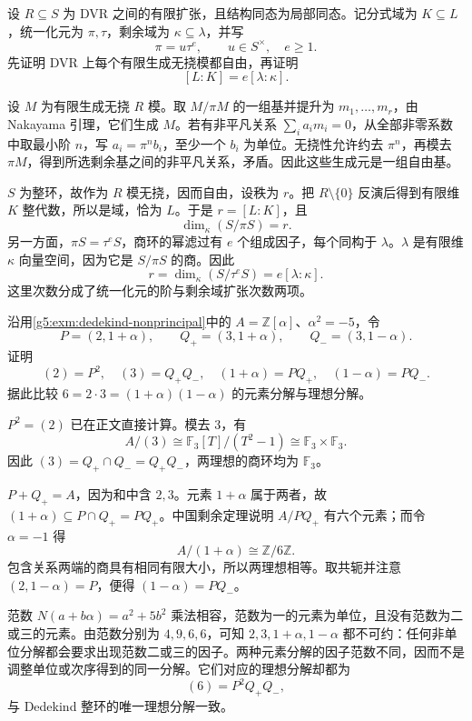 \begin{exercise}\label{g5:ex:finite-dvr-degree}
	设 \(R\subseteq S\) 为 DVR 之间的有限扩张，且结构同态为局部同态。记分式域为 \(K\subseteq L\)，统一化元为 \(\pi,\tau\)，剩余域为 \(\kappa\subseteq\lambda\)，并写
	\[
		\pi=u\tau^e,\qquad u\in S^\times,\quad e\geq1.
	\]
	先证明 DVR 上每个有限生成无挠模都自由，再证明
	\[
		[L:K]=e[\lambda:\kappa].
	\]
\end{exercise}
\begin{solution}
	设 \(M\) 为有限生成无挠 \(R\) 模。取 \(M/\pi M\) 的一组基并提升为 \(m_1,\ldots,m_r\)，由 Nakayama 引理，它们生成 \(M\)。若有非平凡关系 \(\sum_i a_im_i=0\)，从全部非零系数中取最小阶 \(n\)，写 \(a_i=\pi^nb_i\)，至少一个 \(b_i\) 为单位。无挠性允许约去 \(\pi^n\)，再模去 \(\pi M\)，得到所选剩余基之间的非平凡关系，矛盾。因此这些生成元是一组自由基。

	\(S\) 为整环，故作为 \(R\) 模无挠，因而自由，设秩为 \(r\)。把 \(R\setminus\{0\}\) 反演后得到有限维 \(K\) 整代数，所以是域，恰为 \(L\)。于是 \(r=[L:K]\)，且
	\[
		\dim_\kappa(S/\pi S)=r.
	\]
	另一方面，\(\pi S=\tau^eS\)，商环的幂滤过有 \(e\) 个组成因子，每个同构于 \(\lambda\)。\(\lambda\) 是有限维 \(\kappa\) 向量空间，因为它是 \(S/\pi S\) 的商。因此
	\[
		r=\dim_\kappa(S/\tau^eS)=e[\lambda:\kappa].
	\]
	这里次数分成了统一化元的阶与剩余域扩张次数两项。
\end{solution}

\begin{exercise}\label{g5:ex:dedekind-six-factorizations}
	沿用\cref{g5:exm:dedekind-nonprincipal}中的
	\(A=\mathbb Z[\alpha]\)、\(\alpha^2=-5\)，令
	\[
		P=(2,1+\alpha),\qquad
		Q_+=(3,1+\alpha),\qquad Q_-=(3,1-\alpha).
	\]
	证明
	\[
		(2)=P^2,\quad (3)=Q_+Q_-,\quad
		(1+\alpha)=PQ_+,\quad(1-\alpha)=PQ_-.
	\]
	据此比较 \(6=2\cdot3=(1+\alpha)(1-\alpha)\) 的元素分解与理想分解。
\end{exercise}
\begin{solution}
	\(P^2=(2)\) 已在正文直接计算。模去 \(3\)，有
	\[
		A/(3)\cong\mathbb F_3[T]/(T^2-1)
		\cong\mathbb F_3\times\mathbb F_3.
	\]
	因此 \((3)=Q_+\cap Q_-=Q_+Q_-\)，两理想的商环均为 \(\mathbb F_3\)。

	\(P+Q_+=A\)，因为和中含 \(2,3\)。元素 \(1+\alpha\) 属于两者，故
	\((1+\alpha)\subseteq P\cap Q_+=PQ_+\)。中国剩余定理说明 \(A/PQ_+\) 有六个元素；而令 \(\alpha=-1\) 得
	\[
		A/(1+\alpha)\cong\mathbb Z/6\mathbb Z.
	\]
	包含关系两端的商具有相同有限大小，所以两理想相等。取共轭并注意 \((2,1-\alpha)=P\)，便得 \((1-\alpha)=PQ_-\)。

	范数 \(N(a+b\alpha)=a^2+5b^2\) 乘法相容，范数为一的元素为单位，且没有范数为二或三的元素。由范数分别为 \(4,9,6,6\)，可知 \(2,3,1+\alpha,1-\alpha\) 都不可约：任何非单位分解都会要求出现范数二或三的因子。两种元素分解的因子范数不同，因而不是调整单位或次序得到的同一分解。它们对应的理想分解却都为
	\[
		(6)=P^2Q_+Q_-,
	\]
	与 Dedekind 整环的唯一理想分解一致。
\end{solution}


